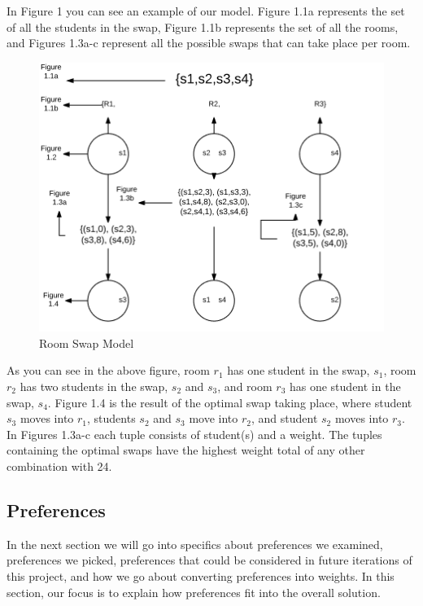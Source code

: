 \documentclass[12pt]{article}
\begin{document}
In Figure 1 you can see an example of our model. Figure 1.1a represents the set of all the students in the swap, Figure 1.1b represents the set of all the rooms, and Figures 1.3a-c represent all the possible swaps that can take place per room. 

\begin{figure}[H]
\centering
\includegraphics[scale=0.6]{model} 
\caption{Room Swap Model}
\end{figure}
\noindent As you can see in the above figure, room $r_1$ has one student in the swap, $s_1$, room $r_2$ has two students in the swap, $s_2$ and $s_3$, and room $r_3$ has one student in the swap, $s_4$. Figure 1.4 is the result of the optimal swap taking place, where student $s_3$ moves into $r_1$, students $s_2$ and $s_3$ move into $r_2$, and student $s_2$ moves into $r_3$. In Figures 1.3a-c each tuple consists of student(s) and a weight. The tuples containing the optimal swaps have the highest weight total of any other combination with 24.

\subsection{Preferences}
In the next section we will go into specifics about preferences we examined, preferences we picked, preferences that could be considered in future iterations of this project, and how we go about converting preferences into weights. In this section, our focus is to explain how preferences fit into the overall solution.\\
\end{document}
